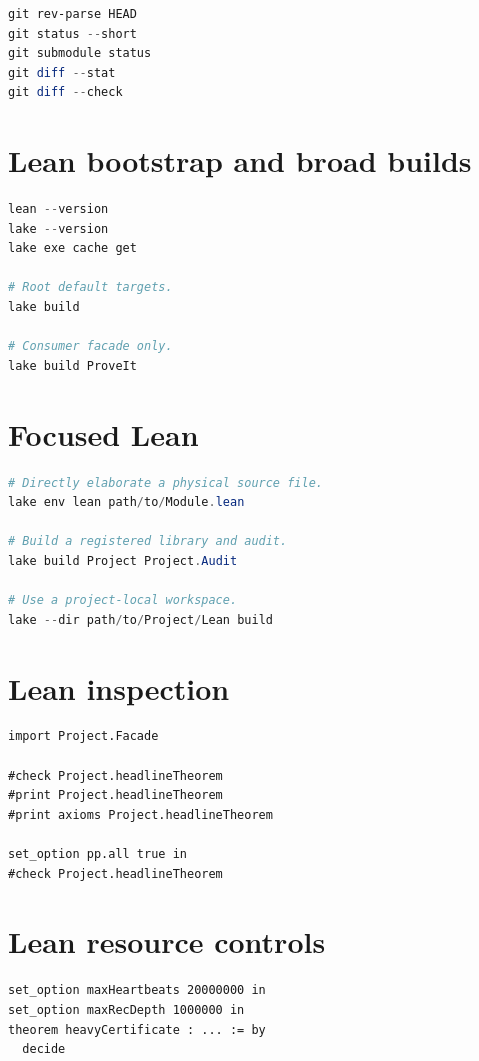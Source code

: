 \documentclass[
  10pt,
  a4paper,
  twoside,
  open=any,
  parskip=half,
  headings=big
]{scrreprt}
\begin{document}
\begin{lstlisting}[language=PowerShell]
git rev-parse HEAD
git status --short
git submodule status
git diff --stat
git diff --check
\end{lstlisting}

\section{Lean bootstrap and broad builds}

\begin{lstlisting}[language=PowerShell]
lean --version
lake --version
lake exe cache get

# Root default targets.
lake build

# Consumer facade only.
lake build ProveIt
\end{lstlisting}

\section{Focused Lean}

\begin{lstlisting}[language=PowerShell]
# Directly elaborate a physical source file.
lake env lean path/to/Module.lean

# Build a registered library and audit.
lake build Project Project.Audit

# Use a project-local workspace.
lake --dir path/to/Project/Lean build
\end{lstlisting}

\section{Lean inspection}

\begin{lstlisting}[language=Lean]
import Project.Facade

#check Project.headlineTheorem
#print Project.headlineTheorem
#print axioms Project.headlineTheorem

set_option pp.all true in
#check Project.headlineTheorem
\end{lstlisting}

\section{Lean resource controls}

\begin{lstlisting}[language=Lean]
set_option maxHeartbeats 20000000 in
set_option maxRecDepth 1000000 in
theorem heavyCertificate : ... := by
  decide
\end{lstlisting}
\end{document}
